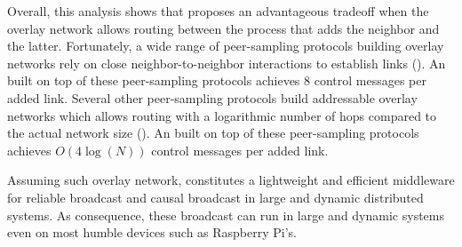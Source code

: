 Overall, this analysis shows that \RPCBROADCAST proposes an advantageous
tradeoff when the overlay network allows routing between the process that adds
the neighbor and the latter. Fortunately, a wide range of peer-sampling
protocols building overlay networks rely on close neighbor-to-neighbor
interactions to establish links (\REF). An \RPCBROADCAST built on top of these
peer-sampling protocols achieves $8$ control messages per added link. Several
other peer-sampling protocols build addressable overlay networks which allows
routing with a logarithmic number of hops compared to the actual network size
(\REF). An \RPCBROADCAST built on top of these peer-sampling protocols achieves
$O(4\log(N))$ control messages per added link.

Assuming such overlay network, \RPCBROADCAST constitutes a lightweight and
efficient middleware for reliable broadcast and causal broadcast in large and
dynamic distributed systems. As consequence, these broadcast can run in large
and dynamic systems even on most humble devices such as Raspberry Pi's.


